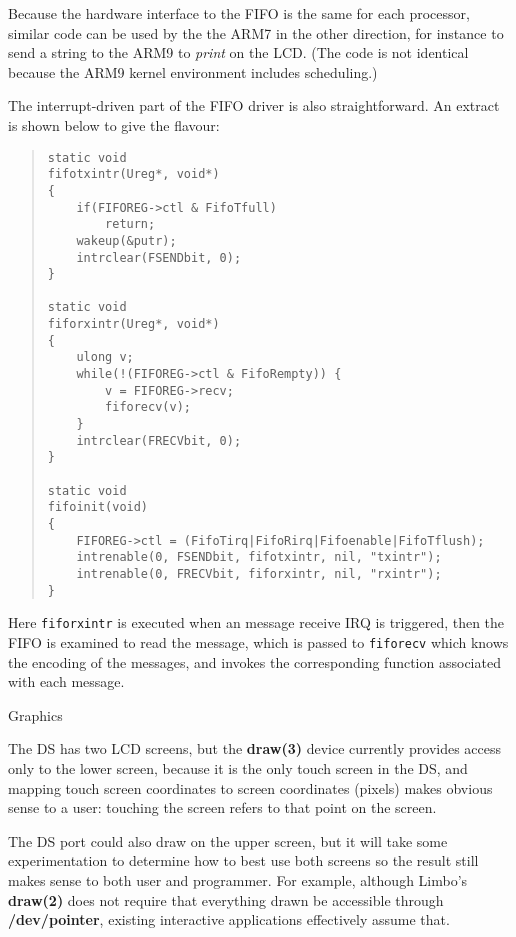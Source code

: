 \documentclass[11pt]{p9article}
\makeatletter
\renewcommand\subsection{\@startsection {subsection}{1}{\z@} {3pt}
{1pt} {\normalfont\normalsize\bfseries}}
\makeatother
\begin{document}
Because the hardware interface to the FIFO is the same for each processor,
similar code can be used by the the ARM7 in the other direction, for instance to send a string
to the ARM9 to \emph{print} on the LCD.
(The code is not identical because the ARM9 kernel environment includes scheduling.)


The interrupt-driven part of the FIFO driver is also straightforward.
An extract is shown below to give the flavour:

\begin{quote}
\begin{verbatim}	
static void
fifotxintr(Ureg*, void*)
{
    if(FIFOREG->ctl & FifoTfull)
        return;
    wakeup(&putr);
    intrclear(FSENDbit, 0);
}

static void
fiforxintr(Ureg*, void*)
{
    ulong v;
    while(!(FIFOREG->ctl & FifoRempty)) {
        v = FIFOREG->recv;
        fiforecv(v);
    }
    intrclear(FRECVbit, 0);
}

static void
fifoinit(void)
{
    FIFOREG->ctl = (FifoTirq|FifoRirq|Fifoenable|FifoTflush);
    intrenable(0, FSENDbit, fifotxintr, nil, "txintr");
    intrenable(0, FRECVbit, fiforxintr, nil, "rxintr");
}
\end{verbatim}
\end{quote}

Here \verb+fiforxintr+ is executed when an message receive IRQ is triggered,
then the FIFO is examined to read the message, which is passed to \verb+fiforecv+
which knows the encoding of the messages, and invokes the corresponding
function associated with each message.

\subsection{Graphics}

The DS has two LCD screens, but
the \textbf{draw(3)} device currently provides access only to the lower screen,
because it is the only touch screen in the DS,
and mapping touch screen coordinates to screen coordinates (pixels) makes
obvious sense to a user: touching the screen refers to that point on the screen.

The DS port could also draw on the upper screen, but
it will take some experimentation to determine
how to best use both screens so the result still makes sense to both user
and programmer. For example, although Limbo's \textbf{draw(2)} does not
require that everything drawn be accessible through \textbf{/dev/pointer},
existing interactive applications effectively assume that.
\end{document}
